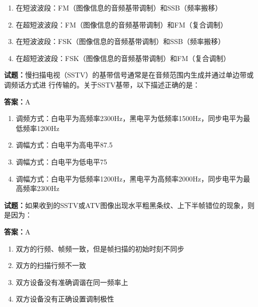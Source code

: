 \documentclass{ctexbook}
\begin{document}
\begin{enumerate}[leftmargin=3em]
  \item 在短波波段：FM（图像信息的音频基带调制）和SSB（频率搬移） 

  \item 在超短波波段：FM（图像信息的音频基带调制）和FM（复合调制） 

  \item 在短波波段：FSK（图像信息的音频基带调制）和SSB（频率搬移） 

  \item 在超短波波段：FSK（图像信息的音频基带调制）和FM（复合调制） 

\end{enumerate}





\vspace{1em}

\textbf{试题：}慢扫描电视（SSTV）的基带信号通常是在音频范围内生成并通过单边带或调频话方式进
行传输的。关于SSTV基带，以下描述正确的是： 

\textbf{答案：}A 

\begin{enumerate}[leftmargin=3em]
  \item 调频方式：白电平为高频率2300Hz，黑电平为低频率1500Hz，同步电平为最低频率1200Hz 

  \item 调幅方式：白电平为高电平87.5%

  \item 调幅方式：白电平为低电平75%


  \item 调幅方式：白电平为低频率1200Hz，黑电平为高频率2000Hz，同步电平为最高频率2300Hz 

\end{enumerate}





\vspace{1em}

\textbf{试题：}如果收到的SSTV或ATV图像出现水平粗黑条纹、上下半帧错位的现象，则是因为： 

\textbf{答案：}A 

\begin{enumerate}[leftmargin=3em]
  \item 双方的行频、帧频一致，但是帧扫描的初始时刻不同步 

  \item 双方的扫描行频不一致 

  \item 双方设备没有准确调谐在同一频率上 

  \item 双方设备没有正确设置调制极性 

\end{enumerate}
\end{document}
